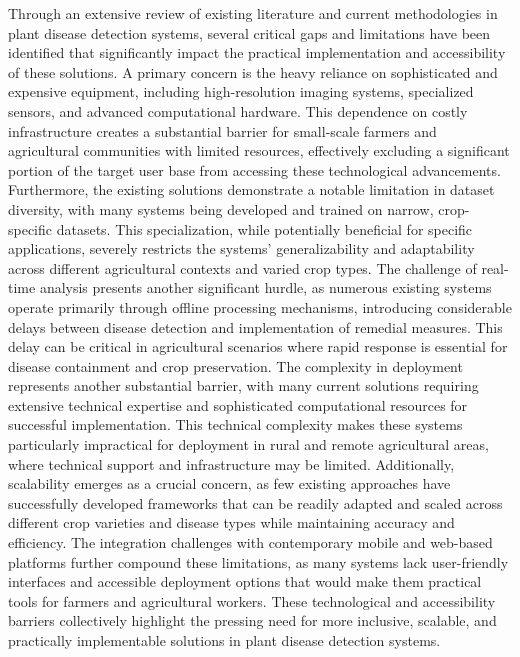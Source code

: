 Through an extensive review of existing literature and current methodologies in plant disease detection systems, several critical gaps and limitations have been identified that significantly impact the practical implementation and accessibility of these solutions. A primary concern is the heavy reliance on sophisticated and expensive equipment, including high-resolution imaging systems, specialized sensors, and advanced computational hardware. This dependence on costly infrastructure creates a substantial barrier for small-scale farmers and agricultural communities with limited resources, effectively excluding a significant portion of the target user base from accessing these technological advancements. Furthermore, the existing solutions demonstrate a notable limitation in dataset diversity, with many systems being developed and trained on narrow, crop-specific datasets. This specialization, while potentially beneficial for specific applications, severely restricts the systems' generalizability and adaptability across different agricultural contexts and varied crop types. The challenge of real-time analysis presents another significant hurdle, as numerous existing systems operate primarily through offline processing mechanisms, introducing considerable delays between disease detection and implementation of remedial measures. This delay can be critical in agricultural scenarios where rapid response is essential for disease containment and crop preservation. The complexity in deployment represents another substantial barrier, with many current solutions requiring extensive technical expertise and sophisticated computational resources for successful implementation. This technical complexity makes these systems particularly impractical for deployment in rural and remote agricultural areas, where technical support and infrastructure may be limited. Additionally, scalability emerges as a crucial concern, as few existing approaches have successfully developed frameworks that can be readily adapted and scaled across different crop varieties and disease types while maintaining accuracy and efficiency. The integration challenges with contemporary mobile and web-based platforms further compound these limitations, as many systems lack user-friendly interfaces and accessible deployment options that would make them practical tools for farmers and agricultural workers. These technological and accessibility barriers collectively highlight the pressing need for more inclusive, scalable, and practically implementable solutions in plant disease detection systems.

